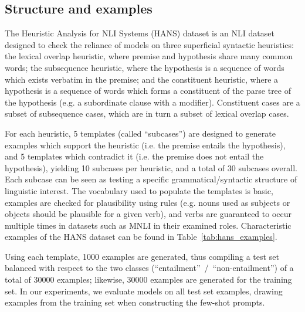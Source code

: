 \documentclass[11pt]{article}
\begin{document}
\subsection{Structure and examples}

The Heuristic Analysis for NLI Systems (HANS) \cite{hans} dataset is an NLI dataset designed to check the reliance of models on three superficial syntactic heuristics: the lexical overlap heuristic, where premise and hypothesis share many common words; the subsequence heuristic, where the hypothesis is a sequence of words which exists verbatim in the premise; and the constituent heuristic, where a hypothesis is a sequence of words which forms a constituent of the parse tree of the hypothesis (e.g. a subordinate clause with a modifier). Constituent cases are a subset of subsequence cases, which are in turn a subset of lexical overlap cases.

For each heuristic, 5 templates (called ``subcases'') are designed to generate examples which support the heuristic (i.e. the premise entails the hypothesis), and 5 templates which contradict it (i.e. the premise does not entail the hypothesis), yielding 10 subcases per heuristic, and a total of 30 subcases overall. Each subcase can be seen as testing a specific grammatical/syntactic structure of linguistic interest. The vocabulary used to populate the templates is basic, examples are checked for plausibility using rules (e.g. nouns used as subjects or objects should be plausible for a given verb), and verbs are guaranteed to occur multiple times in datasets such as MNLI in their examined roles. Characteristic examples of the HANS dataset can be found in Table~\ref{tab:hans_examples}. 

Using each template, 1000 examples are generated, thus compiling a test set balanced with respect to the two classes (``entailment''~/~``non-entailment'') of a total of 30000 examples; likewise, 30000 examples are generated for the training set. In our experiments, we evaluate models on all test set examples, drawing examples from the training set when constructing the few-shot prompts.
\end{document}
